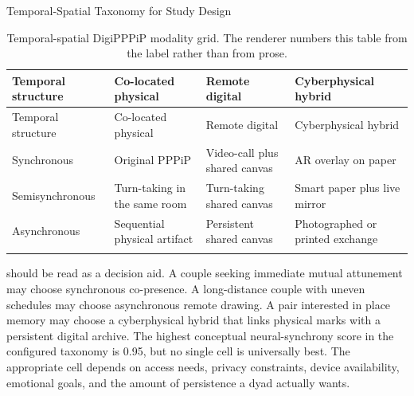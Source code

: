 \documentclass[
  ignorenonframetext,
]{beamer}
\begin{document}
\begin{frame}{Temporal-Spatial Taxonomy for
Study Design}
\begin{longtable}[]{@{}
  >{\raggedright\arraybackslash}p{}
  >{\raggedright\arraybackslash}p{}
  >{\raggedright\arraybackslash}p{}
  >{\raggedright\arraybackslash}p{}@{}}
\caption{Temporal-spatial DigiPPPiP modality grid. The renderer numbers
this table from the label rather than from
prose.}\label{tbl:taxonomy_modes}\tabularnewline
\toprule\noalign{}
\begin{minipage}[b]{\linewidth}\raggedright
Temporal structure
\end{minipage} & \begin{minipage}[b]{\linewidth}\raggedright
Co-located physical
\end{minipage} & \begin{minipage}[b]{\linewidth}\raggedright
Remote digital
\end{minipage} & \begin{minipage}[b]{\linewidth}\raggedright
Cyberphysical hybrid
\end{minipage} \\
\midrule\noalign{}
\endfirsthead
\toprule\noalign{}
\begin{minipage}[b]{\linewidth}\raggedright
Temporal structure
\end{minipage} & \begin{minipage}[b]{\linewidth}\raggedright
Co-located physical
\end{minipage} & \begin{minipage}[b]{\linewidth}\raggedright
Remote digital
\end{minipage} & \begin{minipage}[b]{\linewidth}\raggedright
Cyberphysical hybrid
\end{minipage} \\
\midrule\noalign{}
\endhead
Synchronous & Original PPPiP & Video-call plus shared canvas & AR
overlay on paper \\
Semisynchronous & Turn-taking in the same room & Turn-taking shared
canvas & Smart paper plus live mirror \\
Asynchronous & Sequential physical artifact & Persistent shared canvas &
Photographed or printed exchange \\
\bottomrule\noalign{}
\end{longtable}

 should be read as a decision aid. A couple
seeking immediate mutual attunement may choose synchronous co-presence.
A long-distance couple with uneven schedules may choose asynchronous
remote drawing. A pair interested in place memory may choose a
cyberphysical hybrid that links physical marks with a persistent digital
archive. The highest conceptual neural-synchrony score in the configured
taxonomy is 0.95, but no single cell is universally best. The
appropriate cell depends on access needs, privacy constraints, device
availability, emotional goals, and the amount of persistence a dyad
actually wants.
\end{frame}
\end{document}
